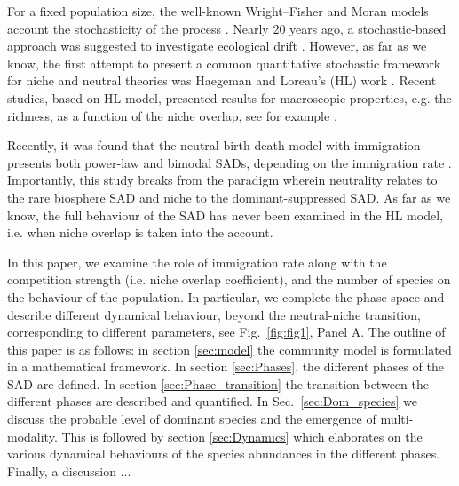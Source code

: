 \documentclass[9pt,lineno]{elife}
\begin{document}
For a fixed population size, the well-known Wright–Fisher and Moran models account the stochasticity of the process  \cite{blythe2007stochastic}. 
Nearly 20 years ago, a stochastic-based approach was suggested to investigate ecological drift  \cite{hubbell2001unified,alonso2006merits}. 
However, as far as we know, the first attempt to present a common quantitative stochastic framework for niche and neutral theories was Haegeman and Loreau’s (HL) work \cite{haegeman2011mathematical}. %
Recent studies, based on HL model, presented results for macroscopic properties, e.g. the richness, as a function of the niche overlap, see for example \cite{capitan2015similar,capitan2017stochastic,capitan2020competitive}. %

Recently, it was found that the neutral birth-death model with immigration presents both power-law and bimodal SADs, depending on the immigration rate \cite{xu2018immigration}. Importantly, this study breaks from the paradigm wherein neutrality relates to the rare biosphere SAD and niche to the dominant-suppressed SAD.
As far as we know, the full behaviour of the SAD  has never been examined in the HL model, i.e. when niche overlap is taken into the account. 

In this paper, we examine the role of immigration rate along with the competition strength (i.e. niche overlap coefficient), and the number of species on the behaviour of the population. 
In particular, we complete the phase space and describe different dynamical behaviour, beyond the neutral-niche transition,  corresponding to different parameters, see Fig.~\ref{fig:fig1}, Panel A. 
The outline of this paper is as follows: in section \ref{sec:model} the community model is formulated in a mathematical framework. 
In section \ref{sec:Phases}, the different phases of the SAD are defined.
In section \ref{sec:Phase_transition} the transition between the different phases are described and quantified. In Sec.~\ref{sec:Dom_species} we discuss the probable level of dominant species and the emergence of multi-modality.
This is followed by section \ref{sec:Dynamics} which elaborates on the various dynamical behaviours of the species abundances in the different phases. 
Finally, a discussion ...
\end{document}
